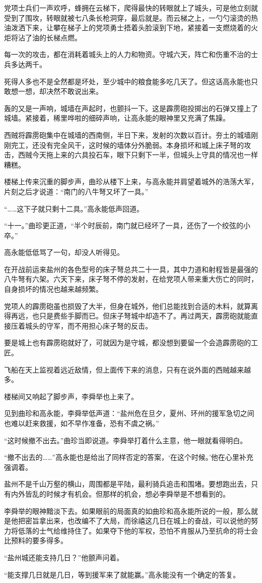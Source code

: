 党项士兵们一声欢呼，蜂拥在云梯下，爬得最快的转眼就上了城头，可是他立刻就受到了围攻，转眼就被七八条长枪洞穿，最后就是。而云梯之上，一勺勺滚烫的热油泼洒下来，让攀在梯子上的党项勇士捂着头脸滚到下地，紧接着一支燃烧着的火炬将沾了油的长梯点燃。

每一次的攻击，都在消耗着城头上的人力和物资。守城六天，阵亡和伤重不治的士兵多达两千。

死得人多也不是全然都是坏处，至少城中的粮食能多吃几天了。但这话高永能也只敢想一想，却决然不敢说出来。

轰的又是一声响，城墙在声起时，也颤抖一下。这是霹雳砲投掷出的石弹又撞上了城墙。紧接着，稀里哗啦的细碎声响，让高永能的眼神里又充满了焦躁。

西贼将霹雳砲集中在城墙的西南侧，半日下来，发射的次数以百计。夯土的城墙刚刚完工，还没有完全风干，这时候的墙体分外脆弱。本身损坏和城上床子弩的攻击，西贼今天拖上来的六具投石车，眼下只剩下一半，但城头上守具的情况也一样糟糕。

楼梯上传来沉重的脚步声，曲珍从楼下上来，与高永能并肩望着城外的浩荡大军，片刻之后才说道：“南门的八牛弩又坏了一具。”

“……这下子就只剩十二具。”高永能低声回道。

“十一。”曲珍更正道，“半个时辰前，南门就已经坏了一具，还伤了一个绞弦的小卒。”

高永能低低骂了一句，却没人听得见。

在开战前运来盐州的各色型号的床子弩总共二十一具，其中力道和射程皆是最强的八牛弩有六架。六天下来，床子弩不停的发射，在给党项人带来重大伤亡的同时，自身损坏的情况也越来越频繁。

党项人的霹雳砲虽也损毁了大半，但身在城外，他们总能找到合适的木料，就算离得再远，也只是费些手脚而已。但床子弩城中却造不了。再过两天，霹雳砲就能直接压着城头的守军，而不用担心床子弩的反击。

要是城上也有霹雳砲就好了，可就因为是守城，都没想到要留一个会造霹雳砲的工匠。

飞船在天上监视着远近敌情，但上面传下来的消息，只有在说外面的西贼越来越多。

楼梯间又响起了脚步声，李舜举也上来了。

见到曲珍和高永能，李舜举低声道：“盐州危在旦夕，夏州、环州的援军急切之间也难以赶来救援，如不早作准备，恐有不虞之祸。”

“这时候撤不出去。”曲珍当即说道。李舜举打着什么主意，他一眼就看得明白。

“撤不出去的……”高永能也是给出了同样否定的答案，‘在这个时候。’他在心里补充强调着。

盐州不是千山万壑的横山，周围都是平陆，最利骑兵追击和围堵。要想跑出去，只有内外皆乱的时候才有机会。但那样的机会，想必李舜举是不想看到的。

李舜举的眼神黯淡下去。如果眼前的局面真的如曲珍和高永能所说的一般，那么就是他把密旨拿出来，也改编不了大局，而徐禧这几日在城上的奋战，可以说他的努力将低落的士气给维持住了。如果夺下他的军权，恐怕不肯服从乃至抗命的将士会比预料的要多得多。

“盐州城还能支持几日？”他颤声问着。

“能支撑几日就是几日，等到援军来了就能赢。”高永能没有一个确定的答复。

